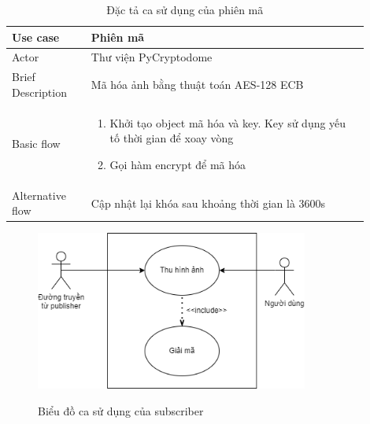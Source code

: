\documentclass{article}
\begin{document}
\begin{table}[H]
    \centering
    \begin{tabular}{|p{0.2\linewidth}|p{0.7\linewidth}|}
    \hline
        Use case & Phiên mã \\
        \hline
        Actor & Thư viện PyCryptodome \\ 
        \hline
        Brief Description & Mã hóa ảnh bằng thuật toán AES-128 ECB\\
        \hline
        Basic flow & \begin{enumerate}
            \item Khởi tạo object mã hóa và key. Key sử dụng yếu tố thời gian để xoay vòng
            \item Gọi hàm encrypt để mã hóa
        \end{enumerate}\\
        \hline
        Alternative flow & Cập nhật lại khóa sau khoảng thời gian là 3600s\\
        \hline
    \end{tabular}
    \caption{Đặc tả ca sử dụng của phiên mã}
    \label{encode}
\end{table}

\begin{figure}[ht]
\centering
\includegraphics[width=0.8\textwidth]{subscriber.png}
\label{sub_fig}
\caption{Biểu đồ ca sử dụng của subscriber}
\end{figure}
\end{document}
